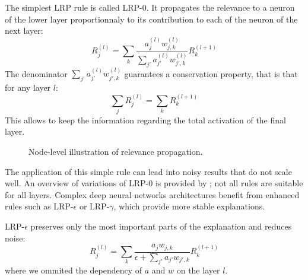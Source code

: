 \documentclass[twocolumn]{../cs-classes/cs-classes}
\newcommand*{\1}{\digitsbb{1}}
\newcommand*{\0}{\digitsbb{0}}
\begin{document}
The simplest LRP rule is called LRP-0. It propagates the relevance to a neuron of the lower layer proportionnaly to its contribution to each of the neuron of the next layer:
\begin{equation}
    \tag{LRP-0}
    R^{(l)}_j = \sum_{k}\frac{a^{(l)}_jw^{(l)}_{j, k}}{\sum_{j'}a^{(l)}_{j'}w^{(l)}_{j', k}} R^{(l+1)}_k
\end{equation}
The denominator $\sum_{j'}a^{(l)}_{j'}w^{(l)}_{j', k}$ guarantees a conservation property, that is that for any layer $l$:
\begin{equation*}
    \sum_j R^{(l)}_j = \sum_k R^{(l+1)}_k
\end{equation*}
This allows to keep the information regarding the total activation of the final layer.

\begin{figure}[H]
    \centering
    \caption{Node-level illustration of relevance propagation.}
\end{figure}

The application of this simple rule can lead into noisy results that do not scale well. An overview of variations of LRP-0 is provided by \cite{montavon-lrp}; not all rules are suitable for all layers. Complex deep neural networks architectures benefit from enhanced rules such as LRP-$\epsilon$ or LRP-$\gamma$, which provide more stable explanations.

LRP-$\epsilon$ preserves only the most important parts of the explanation and reduces noise:
\begin{equation*}
    \tag{LRP-$\epsilon$}
    R^{(l)}_j = \sum_{k}\frac{a_jw_{j, k}}{\epsilon + \sum_{j'}a_{j'}w_{j', k}} R^{(l+1)}_k
\end{equation*}
where we ommited the dependency of $a$ and $w$ on the layer $l$. 
\end{document}
